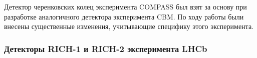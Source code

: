 
Детектор черенковских колец эксперимента COMPASS был взят за основу при разработке аналогичного детектора эксперимента CBM. По ходу работы были внесены существенные изменения, учитывающие специфику этого эксперимента.


\subsubsection{Детекторы \mbox{RICH-1} и \mbox{RICH-2} эксперимента LHCb}\label{sec:LHCb}




